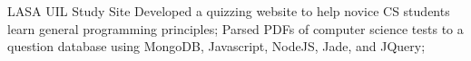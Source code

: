 \project
    {LASA UIL Study Site}
    {
        Developed a quizzing website to help novice CS students learn general programming
        principles;
        Parsed PDFs of computer science tests to a question database using MongoDB, Javascript,
        NodeJS, Jade, and JQuery;
    }
